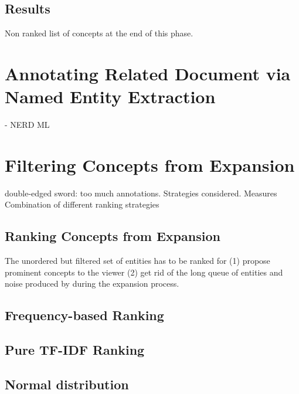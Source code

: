 \documentclass{llncs}
\begin{document}
\subsection{Results}
Non ranked list of concepts at the end of this phase.

\section{Annotating Related Document via Named Entity Extraction}
\label{sec:NEAnnotation}

- NERD ML 

\section{Filtering Concepts from Expansion}
\label{sec:Filtering}

double-edged sword: too much annotations. 
Strategies considered.
Measures
Combination of different ranking strategies


\subsection{Ranking Concepts from Expansion}
\label{sec:Ranking}

The unordered but filtered set of entities has to be ranked for (1) propose prominent concepts to the viewer (2) get rid of the long queue of entities and noise produced by during the expansion process.

\subsection{Frequency-based Ranking}

\subsection{Pure TF-IDF  Ranking}

\subsection{Normal distribution}
\end{document}
